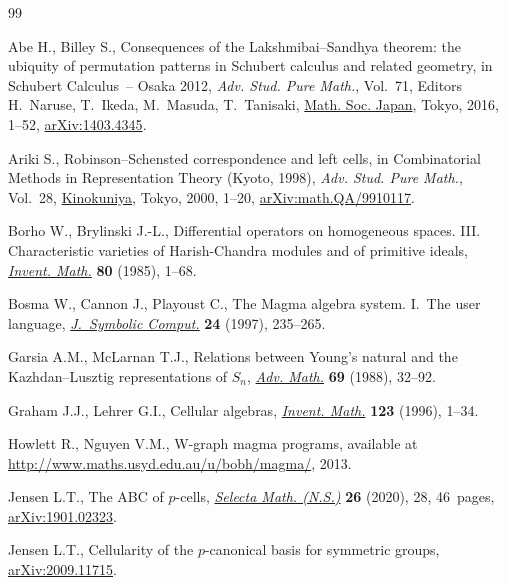 \begin{thebibliography}{99}
\footnotesize\itemsep=0pt

Abe H., Billey S., Consequences of the {L}akshmibai--{S}andhya theorem: the
 ubiquity of permutation patterns in {S}chubert calculus and related geometry,
 in Schubert Calculus~-- {O}saka 2012, \textit{Adv. Stud. Pure Math.},
 Vol.~71, Editors H.~Naruse, T.~Ikeda, M.~Masuda, T.~Tanisaki, \href{https://doi.org/10.2969/aspm/07110001}{Math. Soc.
 Japan}, Tokyo, 2016, 1--52, \href{https://arxiv.org/abs/1403.4345}{arXiv:1403.4345}.

Ariki S., Robinson--{S}chensted correspondence and left cells, in Combinatorial
 Methods in Representation Theory ({K}yoto, 1998), \textit{Adv. Stud. Pure
 Math.}, Vol.~28, \href{https://doi.org/10.2969/aspm/02810001}{Kinokuniya}, Tokyo, 2000, 1--20, \href{https://arxiv.org/abs/math.QA/9910117}{arXiv:math.QA/9910117}.

Borho W., Brylinski J.-L., Differential operators on homogeneous spaces. {III}.
 {C}haracteristic varieties of {H}arish-{C}handra modules and of primitive
 ideals, \href{https://doi.org/10.1007/BF01388547}{\textit{Invent. Math.}} \textbf{80} (1985), 1--68.

Bosma W., Cannon J., Playoust C., The {M}agma algebra system. {I}.~{T}he user
 language, \href{https://doi.org/10.1006/jsco.1996.0125}{\textit{J.~Symbolic Comput.}} \textbf{24} (1997), 235--265.

Garsia A.M., McLarnan T.J., Relations between {Y}oung's natural and the
 {K}azhdan--{L}usztig representations of {$S_n$}, \href{https://doi.org/10.1016/0001-8708(88)90060-6}{\textit{Adv. Math.}}
 \textbf{69} (1988), 32--92.

Graham J.J., Lehrer G.I., Cellular algebras, \href{https://doi.org/10.1007/BF01232365}{\textit{Invent. Math.}}
 \textbf{123} (1996), 1--34.

Howlett R., Nguyen V.M., W-graph magma programs, {a}vailable at
 \url{http://www.maths.usyd.edu.au/u/bobh/magma/}, 2013.

Jensen L.T., The {ABC} of {$p$}-cells, \href{https://doi.org/10.1007/s00029-020-0552-1}{\textit{Selecta Math. (N.S.)}}
 \textbf{26} (2020), 28, 46~pages, \href{https://arxiv.org/abs/1901.02323}{arXiv:1901.02323}.

Jensen L.T., Cellularity of the $p$-canonical basis for symmetric groups,
 \href{https://arxiv.org/abs/2009.11715}{arXiv:2009.11715}.


\end{thebibliography}
